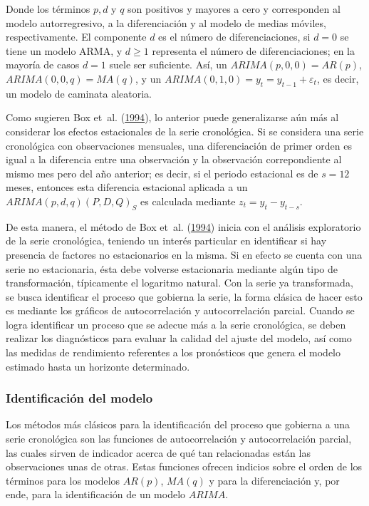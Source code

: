 \documentclass[
]{article}
\begin{document}
Donde los términos \(p, d\) y \(q\) son positivos y mayores a cero y
corresponden al modelo autorregresivo, a la diferenciación y al modelo
de medias móviles, respectivamente. El componente \(d\) es el número de
diferenciaciones, si \(d=0\) se tiene un modelo ARMA, y \(d\geq1\)
representa el número de diferenciaciones; en la mayoría de casos \(d=1\)
suele ser suficiente. Así, un \(ARIMA(p,0,0)=AR(p)\),
\(ARIMA(0,0,q)=MA(q)\), y un \(ARIMA(0,1,0)=y_t=y_{t-1}+\varepsilon_t\),
es decir, un modelo de caminata aleatoria.

Como sugieren Box et~al. (\protect\hyperlink{ref-box-jenkins}{1994}), lo
anterior puede generalizarse aún más al considerar los efectos
estacionales de la serie cronológica. Si se considera una serie
cronológica con observaciones mensuales, una diferenciación de primer
orden es igual a la diferencia entre una observación y la observación
correpondiente al mismo mes pero del año anterior; es decir, si el
periodo estacional es de \(s=12\) meses, entonces esta diferencia
estacional aplicada a un \(ARIMA(p,d,q)(P,D,Q)_S\) es calculada mediante
\(z_t=y_t-y_{t-s}\).

De esta manera, el método de Box et~al.
(\protect\hyperlink{ref-box-jenkins}{1994}) inicia con el análisis
exploratorio de la serie cronológica, teniendo un interés particular en
identificar si hay presencia de factores no estacionarios en la misma.
Si en efecto se cuenta con una serie no estacionaria, ésta debe volverse
estacionaria mediante algún tipo de transformación, típicamente el
logaritmo natural. Con la serie ya transformada, se busca identificar el
proceso que gobierna la serie, la forma clásica de hacer esto es
mediante los gráficos de autocorrelación y autocorrelación parcial.
Cuando se logra identificar un proceso que se adecue más a la serie
cronológica, se deben realizar los diagnósticos para evaluar la calidad
del ajuste del modelo, así como las medidas de rendimiento referentes a
los pronósticos que genera el modelo estimado hasta un horizonte
determinado.

\subsubsection{Identificación del modelo}

Los métodos más clásicos para la identificación del proceso que gobierna
a una serie cronológica son las funciones de autocorrelación y
autocorrelación parcial, las cuales sirven de indicador acerca de qué
tan relacionadas están las observaciones unas de otras. Estas funciones
ofrecen indicios sobre el orden de los términos para los modelos
\(AR(p)\), \(MA(q)\) y para la diferenciación y, por ende, para la
identificación de un modelo \(ARIMA\).
\end{document}
